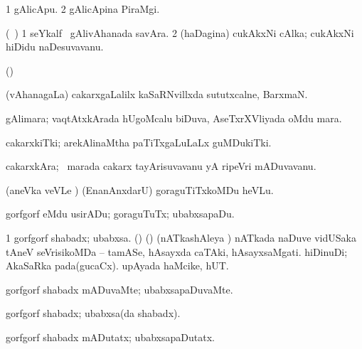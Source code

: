 {{{{{{\bentry
{} 
\gl{\nA}
\expl{}
\bmng
\bnum
\num{1} gAlicApu. 
\num{2} gAlicApina PiraMgi. 
\enum
\emng
\eentry

\bentry
{} 
\gl{\nA}
\expl{}
\bmng
(\kanmu\ \ame) 
\bnum
\num{1} seYkalf \mo\ gAlivAhanada savAra. 
\num{2} (haDagina) cukAkxNi cAlka; cukAkxNi hiDidu naDesuvavanu. 
\enum
\emng
\eentry

\bentry
{} 
\gl{\nA}
\bmng
(\ame)  
\emng
\eentry

\bentry
{} 
\gl{\nA}
\expl{}
\bmng
(vAhanagaLa) cakarxgaLalilx kaSaRNvillxda sututxcalne, BarxmaN. 
\emng
\eentry

\bentry
{} 
\gl{\nA}
\expl{}
\bmng
gAlimara; vaqtAtxkArada hUgoMcalu biDuva, AseTxrXVliyada oMdu mara. 
\emng
\eentry

\bentry
{} 
\gl{\nA}
\expl{}
\bmng
cakarxkiTki; arekAlinaMtha paTiTxgaLuLaLx guMDukiTki. 
\emng
\eentry

\bentry
{} 
\gl{\nA}
\expl{}
\bmng
cakarxkAra; \kanmu\ marada cakarx tayArisuvavanu yA ripeVri mADuvavanu. 
\emng
\eentry

\bentry
{} 
\gl{\sakirx}
\expl{}
\bmng
(aneVka veVLe ) (EnanAnxdarU) goraguTiTxkoMDu heVLu. 
\emng

\noindent 
\gl{\akirx}
\expl{}
\bmng
gorfgorf eMdu usirADu; goraguTuTx; ubabxsapaDu. 
\emng
\eentry

\bentry
{} 
\gl{\nA}
\expl{}
\bmng
\bnum
\num{1} gorfgorf shabadx; ubabxsa. 
 (\AmA) 
\banum
{} (\birx) (nATkashAleya \ashi) nATkada naDuve vidUSaka tAneV seVrisikoMDa -- tamASe, hAsayxda caTAki, hAsayxsaMgati. 
 hiDinuDi; AkaSaRka pada(gucaCx). 
 upAyada haMcike, hUT. 
\eanum
\numie
\enum
\emng
\eentry

\bentry
{} 
\gl{\kirxvi}
\expl{}
\bmng
gorfgorf shabadx mADuvaMte; ubabxsapaDuvaMte. 
\emng
\eentry

\bentry
{} 
\gl{\nA}
\expl{}
\bmng
gorfgorf shabadx; ubabxsa(da shabadx). 
\emng
\eentry

\bentry
{} 
\gl{\kirxvi}
\expl{}
\bmng
gorfgorf shabadx mADutatx; ubabxsapaDutatx. 
\emng
\eentry

}}}}}}

